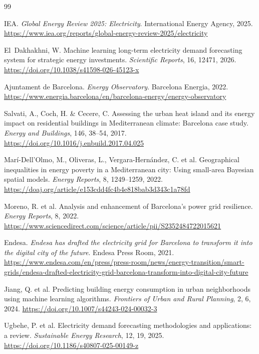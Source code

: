 \documentclass[12pt, a4paper]{article}
\begin{document}
\newpage
\begin{thebibliography}{99}

IEA. \textit{Global Energy Review 2025: Electricity}. International Energy Agency, 2025.
\url{https://www.iea.org/reports/global-energy-review-2025/electricity}

El~Dakhakhni, W. Machine learning long-term electricity demand forecasting system for strategic energy investments. \textit{Scientific Reports}, 16, 12471, 2026.
\url{https://doi.org/10.1038/s41598-026-45123-x}

Ajuntament de Barcelona. \textit{Energy Observatory}. Barcelona Energia, 2022.
\url{https://www.energia.barcelona/en/barcelona-energy/energy-observatory}

Salvati, A., Coch, H. \& Cecere, C. Assessing the urban heat island and its energy impact on residential buildings in Mediterranean climate: Barcelona case study. \textit{Energy and Buildings}, 146, 38--54, 2017.
\url{https://doi.org/10.1016/j.enbuild.2017.04.025}

Marí-Dell'Olmo, M., Oliveras, L., Vergara-Hernández, C. et al. Geographical inequalities in energy poverty in a Mediterranean city: Using small-area Bayesian spatial models. \textit{Energy Reports}, 8, 1249--1259, 2022.
\url{https://doaj.org/article/e153cdd4fc4b4e818bab3d343c1a78fd}

Moreno, R. et al. Analysis and enhancement of Barcelona's power grid resilience. \textit{Energy Reports}, 8, 2022.
\url{https://www.sciencedirect.com/science/article/pii/S2352484722015621}

Endesa. \textit{Endesa has drafted the electricity grid for Barcelona to transform it into the digital city of the future}. Endesa Press Room, 2021.
\url{https://www.endesa.com/en/press/press-room/news/energy-transition/smart-grids/endesa-drafted-electricity-grid-barcelona-transform-into-digital-city-future}

Jiang, Q. et al. Predicting building energy consumption in urban neighborhoods using machine learning algorithms. \textit{Frontiers of Urban and Rural Planning}, 2, 6, 2024.
\url{https://doi.org/10.1007/s44243-024-00032-3}

Ugbehe, P. et al. Electricity demand forecasting methodologies and applications: a review. \textit{Sustainable Energy Research}, 12, 19, 2025.
\url{https://doi.org/10.1186/s40807-025-00149-z}


\end{thebibliography}
\end{document}
